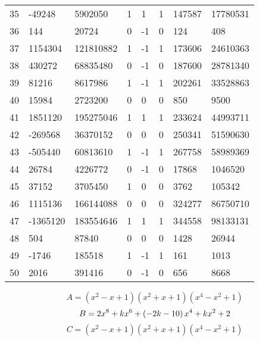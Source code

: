 \documentclass{amsart}
\begin{document}
\begin{longtable}{|l|l|l|lllll|}
35&-49248&5902050&1&1&1&147587&17780531\\
36&144&20724&0&-1&0&124&408\\
37&1154304&121810882&1&-1&1&173606&24610363\\
38&430272&68835480&0&-1&0&187600&28781340\\
39&81216&8617986&1&-1&1&202261&33528863\\
40&15984&2723200&0&0&0&850&9500\\
41&1851120&195275046&1&1&1&233624&44993711\\
42&-269568&36370152&0&0&0&250341&51590630\\
43&-505440&60813610&1&-1&1&267758&58989369\\
44&26784&4226772&0&-1&0&17868&1046520\\
45&37152&3705450&1&0&0&3762&105342\\
46&1115136&166144088&0&0&0&324277&86750710\\
47&-1365120&183554646&1&1&1&344558&98133131\\
48&504&87840&0&0&0&1428&26944\\
49&-1746&185518&1&-1&1&161&1013\\
50&2016&391416&0&-1&0&656&8668\\
\hline
\end{longtable}
$$A=(x^2
 - x
 + 1)(x^2
 + x
 + 1)(x^4
 - x^2
 + 1)$$
$$B=2\*x^8
 + k\*x^6
 + \left(-2\*k
 - 10\right) \*x^4
 + k\*x^2
 + 2$$
$$C=(x^2
 - x
 + 1)(x^2
 + x
 + 1)(x^4
 - x^2
 + 1)$$
\end{document}
